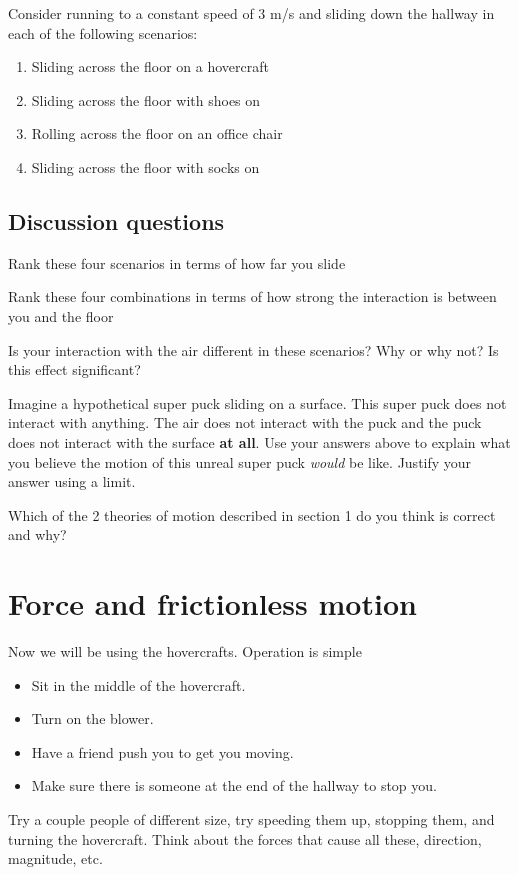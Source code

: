 \documentclass{handout}
\begin{document}
Consider running to a constant speed of 3 m/s and sliding down the hallway in each of the following scenarios:
\begin{enumerate}
    \item Sliding across the floor on a hovercraft
    \item Sliding across the floor with shoes on
    \item Rolling across the floor on an office chair
    \item Sliding across the floor with socks on
\end{enumerate}

\subsection{Discussion questions}
\begin{questions}
    \question Rank these four scenarios in terms of how far you slide


    \question Rank these four combinations in terms of how strong the interaction is
between you and the floor



    \question Is your interaction with the air different in these scenarios? Why or why
not? Is this effect significant?

    \answerspace{1.5in}

    \question Imagine a hypothetical super puck sliding on a surface. This super puck
does not interact with anything. The air does not interact with the puck
and the puck does not interact with the surface \textbf{at all}. Use
your answers above to explain what you believe the motion of this
unreal super puck \emph{would} be like. Justify your answer using a limit.

    \answerspace{1.5in}

    \question Which of the 2 theories of motion described in section 1 do you think is correct and why?

    \answerspace{1.5in}

\end{questions}

\section{Force and frictionless
motion}\label{force-and-frictionless-motion}

Now we will be using the hovercrafts. Operation is simple
\begin{itemize}
    \item  Sit in the middle of the hovercraft.
\item Turn on the blower.
\item Have a friend push you to get you moving.
\item Make sure there is someone at the end of the
hallway to stop you.
\end{itemize}
Try a couple people of different size, try speeding them up, stopping them, and turning the hovercraft. Think about the forces that cause all these, direction, magnitude, etc.
\end{document}
